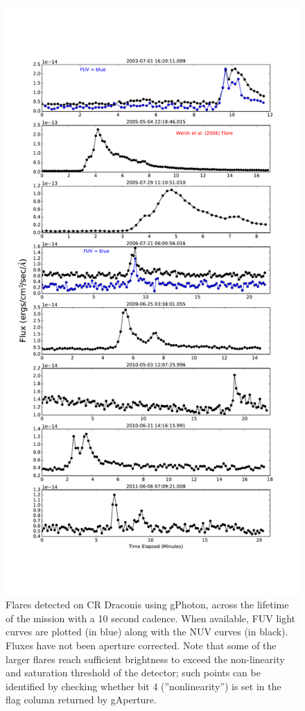 \documentclass[preprint]{aastex}
\begin{document}
\clearpage
\begin{figure}[h]
\includegraphics[scale=0.375]{Fig13.pdf}
\caption{Flares detected on CR Draconis using gPhoton, across the lifetime of the mission with a 10 second cadence. When available, FUV light curves are plotted (in blue) along with the NUV curves (in black). Fluxes have not been aperture corrected. Note that some of the larger flares reach sufficient brightness to exceed the non-linearity and saturation threshold of the detector; such points can be identified by checking whether bit 4 (''nonlinearity'') is set in the flag column returned by gAperture.
\label{crdraflares}}
\end{figure}
\clearpage
\end{document}
